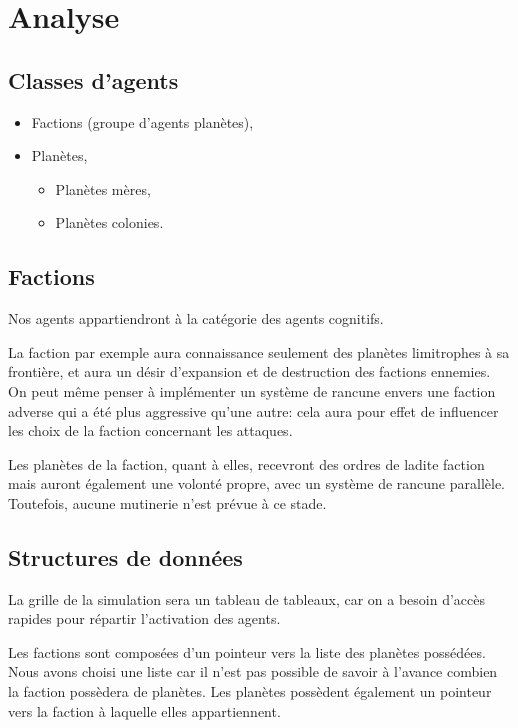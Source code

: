 \documentclass{article}
\begin{document}
  \section{Analyse}
    \subsection{Classes d'agents}
      \begin{itemize}
        \item Factions (groupe d'agents planètes),
        \item Planètes,
        \begin{itemize}
          \item Planètes mères,
          \item Planètes colonies.
        \end{itemize}
      \end{itemize}

    \subsection{Factions}
      Nos agents appartiendront à la catégorie des agents cognitifs. 

      La faction par exemple aura connaissance seulement des planètes limitrophes à sa frontière, et aura un désir d'expansion et de destruction des factions ennemies. On peut même penser à implémenter un système de rancune envers une faction adverse qui a été plus aggressive qu'une autre: cela aura pour effet de influencer les choix de la faction concernant les attaques.

      Les planètes de la faction, quant à elles, recevront des ordres de ladite faction mais auront également une volonté propre, avec un système de rancune parallèle. Toutefois, aucune mutinerie n'est prévue à ce stade.

    
    \subsection{Structures de données}
    La grille de la simulation sera un tableau de tableaux, car on a besoin d'accès rapides pour répartir l'activation des agents.

    Les factions sont composées d'un pointeur vers la liste des planètes possédées. Nous avons choisi une liste car il n'est pas possible de savoir à l'avance combien la faction possèdera de planètes. Les planètes possèdent également un pointeur vers la faction à laquelle elles appartiennent.
\end{document}
